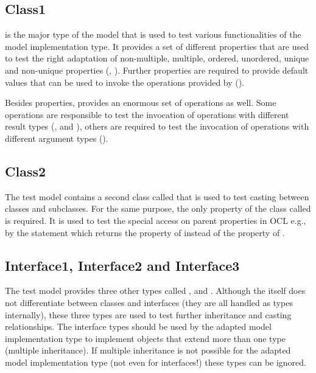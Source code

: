 \subsection{Class1}

 is the major type of the model that is used to test various functionalities of the model implementation type. It provides a set of different properties that are used to test the right adaptation of non-multiple, multiple, ordered, unordered, unique and non-unique properties (, ). Further properties are required to provide default values that can be used to invoke the operations provided by  ().

Besides properties,  provides an enormous set of operations as well. Some operations are responsible to test the invocation of operations with different result types (,  and ), others are required to test the invocation of operations with different argument types ().


\subsection{Class2}

The test model contains a second class called  that is used to test casting between classes and subclasses. For the same purpose, the only property of the class called  is required. It is used to test the special access on parent properties in \acs{OCL} e.g., by the statement  which returns the property of  instead of the property of .


\subsection{Interface1, Interface2 and Interface3}

The test model provides three other types called ,  and . Although the  itself does not differentiate between classes and interfaces (they are all handled as types internally), these three types are used to test further inheritance and casting relationships. The interface types should be used by the adapted model implementation type to implement objects that extend more than one type (multiple inheritance). If multiple inheritance is not possible for the adapted model implementation type (not even for interfaces!) these types can be ignored.


